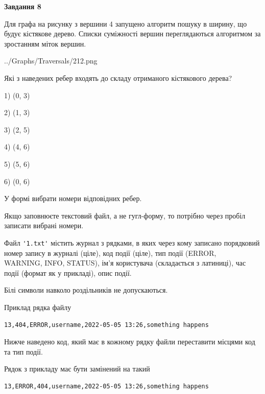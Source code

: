 \documentclass[12pt, ukrainian]{article}
\def\code#1{\Verb!#1!}
\begin{document}
{\begin {large}
{\begin {center}\textbf{Завдання 8}\end {center}}\par
Для графа на рисунку з вершини 4 запущено алгоритм пошуку в ширину, що будує кістякове дерево. Списки суміжності вершин переглядаються алгоритмом за зростанням міток вершин.\par
\begin{center}
	{../Graphs/Traversals/212.png}
\end{center}
\par Які з наведених ребер входять до складу отриманого кістякового дерева?\par
1) (0, 3)\par
2) (1, 3)\par
3) (2, 5)\par
4) (4, 6)\par
5) (5, 6)\par
6) (0, 6)\par
{\vskip 15pt} У формі вибрати номери відповідних ребер.


Якщо заповнюєте текстовий файл, а не гугл-форму, то потрібно через пробіл записа\-ти вибрані номери.\par
\newpage


Файл \code{'1.txt'} містить журнал з рядками, в яких через кому записано поряд\-ко\-вий номер запису в журналі (ціле), код події (ціле), тип події (ERROR,\\ WARNING, INFO, STATUS), ім'я користувача (складається з латиниці), час події (фор\-мат як у прикладі), опис події.

Білі символи навколо роздільників не допускаються.

Приклад рядка файлу



\begin{verbatim}
13,404,ERROR,username,2022-05-05 13:26,something happens
\end{verbatim}


Нижче наведено код, який має в кожному рядку файли переставити місцями код та тип події.

Рядок з прикладу має бути замінений на такий



\begin{verbatim}
13,ERROR,404,username,2022-05-05 13:26,something happens
\end{verbatim}





\end{large}}
\end{document}
